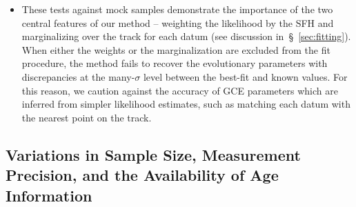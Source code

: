\documentclass[ms.tex]{subfiles}
\begin{document}
\begin{itemize}
	\item These tests against mock samples demonstrate the importance of
	the two central features of our method -- weighting the likelihood by the
	SFH and marginalizing over the track for each datum (see discussion
	in~\S~\ref{sec:fitting}).
	When either the weights or the marginalization are excluded from the fit
	procedure, the method fails to recover the evolutionary parameters with
	discrepancies at the many-$\sigma$ level between the best-fit and known
	values.
	For this reason, we caution against the accuracy of GCE parameters which
	are inferred from simpler likelihood estimates, such as matching each datum
	with the nearest point on the track.

\end{itemize}

\subsection{Variations in Sample Size, Measurement Precision, and the
Availability of Age Information}
\label{sec:mocks:variations}
\end{document}
